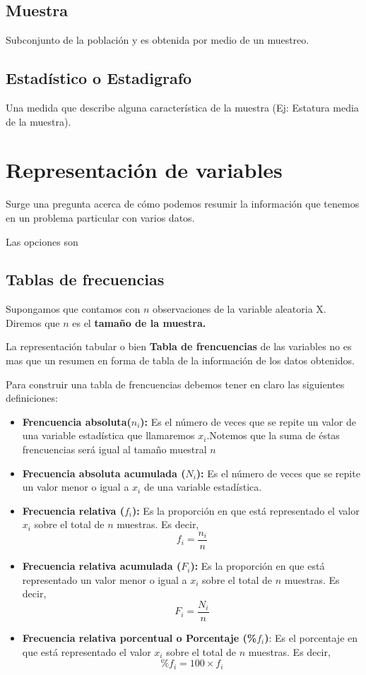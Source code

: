 \documentclass[12pt,twocolumn,a4paper]{report}
\begin{document}
\section*{Muestra}
Subconjunto de la población y es obtenida por medio de un muestreo. 

\section*{Estadístico o Estadigrafo}
Una medida que describe alguna característica de la muestra (Ej: Estatura media de la muestra).

\twocolumn

\chapter*{Representación de variables}
Surge una pregunta acerca de cómo podemos resumir la información que tenemos en un problema particular con varios datos.

Las opciones son

\section*{Tablas de frecuencias}
Supongamos que contamos con $n$ observaciones de la variable aleatoria X. Diremos que $n$ es el \textbf{tamaño de la muestra.}

La representación tabular o bien \textbf{Tabla de frencuencias} de las variables no es mas que un resumen en forma de tabla de la información de los datos obtenidos. 

Para construir una tabla de frencuencias debemos tener en claro las siguientes definiciones:
\begin{itemize}
\setlength\itemsep{0.001cm}
\item{\textbf{Frencuencia absoluta($n_i$):} Es el número de veces que se repite un valor de una variable estadística que llamaremos $x_i$.Notemos que la suma de éstas frencuencias será igual al tamaño muestral $n$}
\item{\textbf{Frecuencia absoluta acumulada ($N_i$): }Es el número de veces que se repite un valor menor o igual a $x_i$ de una variable estadística.}
\item{\textbf{Frecuencia relativa ($f_i$):} Es la proporción en que está representado el valor $x_i$ sobre el total de $n$ muestras. Es decir, $$f_i = \dfrac{n_i}{n}$$}
\item{\textbf{Frecuencia relativa acumulada ($F_i$):} Es la proporción en que está representado un valor menor o igual a $x_i$ sobre el total de $n$ muestras. Es decir, $$F_i = \dfrac{N_i}{n}$$}
\item{\textbf{Frecuencia relativa porcentual o Porcentaje (\%$f_i$)}:} Es el porcentaje en que está representado el valor $x_i$ sobre el total de $n$ muestras. Es decir, $$\% f_i = 100 \times f_i $$
\end{itemize}
\end{document}
